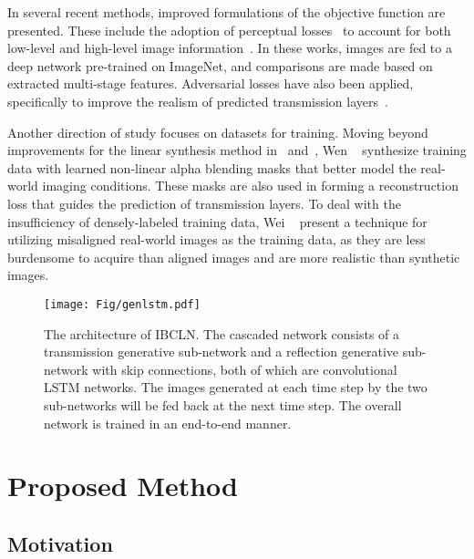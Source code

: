 \documentclass[10pt,twocolumn,letterpaper]{article}
\begin{document}
In several recent methods, improved formulations of the objective function are presented. These include the adoption of perceptual losses~\cite{johnson2016perceptual} to account for both low-level and high-level image information~\cite{chi2018single, jin2018learning, zhang2018single}. In these works, images are fed to a deep network pre-trained on ImageNet, and comparisons are made based on extracted multi-stage features. Adversarial losses have also been applied, specifically to improve the realism of predicted transmission layers~\cite{zhang2018single, lee2018generative, wen2019single, wei2019single}.


Another direction of study focuses on datasets for training. Moving beyond improvements for the linear synthesis method in~\cite{fan2017generic} and~\cite{zhang2018single}, Wen \etal~\cite{wen2019single} synthesize training data with learned non-linear alpha blending masks that better model the real-world imaging conditions. These masks are also used in forming a reconstruction loss that guides the prediction of transmission layers. To deal with the insufficiency of densely-labeled training data, Wei \etal~\cite{wei2019single} present a technique for utilizing misaligned real-world images as the training data, as they are less burdensome to acquire than aligned images and are more realistic than synthetic images.
\begin{figure*}[htbp]
    \begin{center}
    \texttt{[image: Fig/genlstm.pdf]}
    \end{center}
    \vspace{-0.5em}
    \caption{The architecture of IBCLN. The cascaded network consists of a transmission generative sub-network  and a reflection generative sub-network  with skip connections, both of which are convolutional LSTM networks. The images generated at each time step by the two sub-networks will be fed back at the next time step. The overall network is trained in an end-to-end manner.
    }
    \vspace{-0.5em}
    \label{fig:network}
\end{figure*}

\section{Proposed Method}

\subsection{Motivation} \label{sec:motivation}
\end{document}
